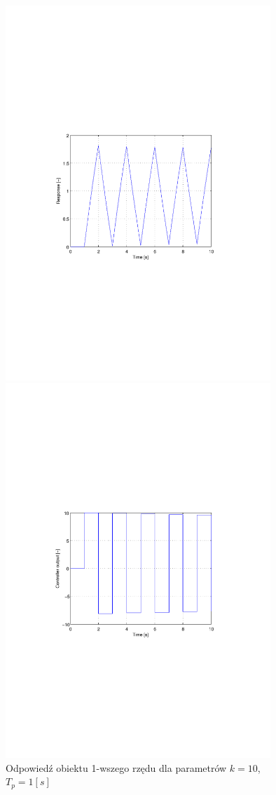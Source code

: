\documentclass[12pt]{article}
\begin{document}
\newpage

\begin{figure}[!htb]
	\begin{center}
		\includegraphics[trim=5cm 9cm 5cm 9cm,width=10cm]{../res/img/d1_1_10y.pdf} 
	\end{center}
	
	\begin{center}
		\includegraphics[trim=5cm 9cm 5cm 9cm,width=10cm]{../res/img/d1_1_10u.pdf} 
	\end{center}
	\caption{Odpowiedź obiektu 1-wszego rzędu dla parametrów $k=10$,
	$T_p=1[s]$}
\end{figure}
\end{document}
